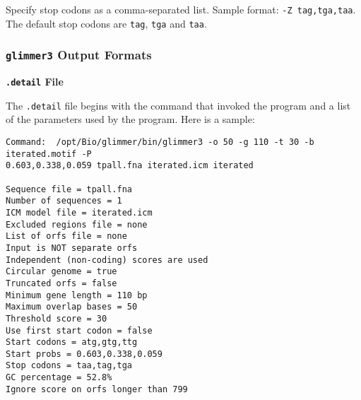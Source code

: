 \documentclass[fleqn,titlepage,11pt]{article}
\def\Pg#1{\texttt{#1}}
\begin{document}
  Specify stop codons as a comma-separated list.
  Sample format:  \verb`-Z tag,tga,taa`.
  The default stop codons are \Pg{tag}, \Pg{tga} and \Pg{taa}.
\el


\subsubsection{\Pg{glimmer3} Output Formats}

\smallskip
\noindent\textbf{\Pg{.detail} File}
\smallskip

The \Pg{.detail} file begins with the command that invoked the program and
a list of the parameters
used by the program.  Here is a sample:
\BSV\begin{verbatim}
Command:  /opt/Bio/glimmer/bin/glimmer3 -o 50 -g 110 -t 30 -b iterated.motif -P 
0.603,0.338,0.059 tpall.fna iterated.icm iterated

Sequence file = tpall.fna
Number of sequences = 1
ICM model file = iterated.icm
Excluded regions file = none
List of orfs file = none
Input is NOT separate orfs
Independent (non-coding) scores are used
Circular genome = true
Truncated orfs = false
Minimum gene length = 110 bp
Maximum overlap bases = 50
Threshold score = 30
Use first start codon = false
Start codons = atg,gtg,ttg
Start probs = 0.603,0.338,0.059
Stop codons = taa,tag,tga
GC percentage = 52.8%
Ignore score on orfs longer than 799
\end{verbatim}\ESV
\end{document}
